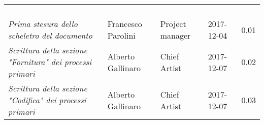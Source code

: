 \newpage 
\section*{}
\begin{table}[H]
	\centering
	\begin{tabular}{p{4cm}|C{3cm}|C{3cm}|R{2.5cm}|R{2cm}}
		
		 & & & & \\
		
		
		\emph{}	 & & & & \\
		\hline
		
		& & & & \\
		\hline
		
		& & & & \\
		\hline
		
		\emph{Prima stesura dello scheletro del documento} & Francesco Parolini & Project manager & 2017-12-04 & 0.01 \\
		
		\emph{Scrittura della sezione "Fornitura" dei processi primari} & Alberto Gallinaro & Chief Artist & 2017-12-07 & 0.02 \\
		\emph{Scrittura della sezione "Codifica" dei processi primari} & Alberto Gallinaro & Chief Artist & 2017-12-07 & 0.03 \\
		
	\end{tabular}
	
\end{table}


\clearpage